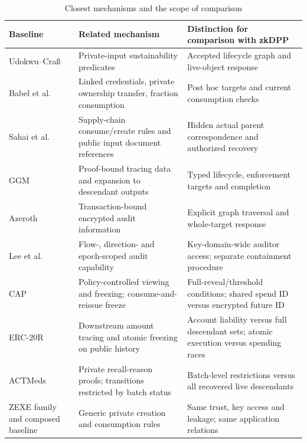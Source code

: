 \begin{table}[t]
\centering
\small
\caption{Closest mechanisms and the scope of comparison}
\label{tab:related}
\begin{tabularx}{\textwidth}{@{}p{30mm}YY@{}}
\toprule
Baseline & Related mechanism & Distinction for comparison with zkDPP \\
\midrule
Udokwu--Craß~\cite{udokwu-crass-2026}
& Private-input sustainability predicates
& Accepted lifecycle graph and live-object response \\
Babel et al.~\cite{babel-hicss-2025}
& Linked credentials, private ownership transfer, fraction consumption
& Post hoc targets and current consumption checks \\
Sahai et al.~\cite{sahai-supply-chain-2020}
& Supply-chain consume/create rules and public input document references
& Hidden actual parent correspondence and authorized recovery \\
GGM~\cite{garman-accountable-privacy-2017}
& Proof-bound tracing data and expansion to descendant outputs
& Typed lifecycle, enforcement targets and completion \\
Azeroth~\cite{jeong-azeroth-2023}
& Transaction-bound encrypted audit information
& Explicit graph traversal and whole-target response \\
Lee et al.~\cite{lee-token-guided-2026}
& Flow-, direction- and epoch-scoped audit capability
& Key-domain-wide auditor access; separate containment procedure \\
CAP~\cite{espresso-cap-spec-2022}
& Policy-controlled viewing and freezing; consume-and-reissue freeze
& Full-reveal/threshold conditions; shared spend ID versus encrypted future ID \\
ERC-20R~\cite{wang-erc20r-2022}
& Downstream amount tracing and atomic freezing on public history
& Account liability versus full descendant sets; atomic execution versus spending races \\
ACTMeds~\cite{sitaula-actmeds-2026}
& Private recall-reason proofs; transitions restricted by batch status
& Batch-level restrictions versus all recovered live descendants \\
ZEXE family and composed baseline~\cite{bowe-zexe-2020,xiong-verizexe-2023}
& Generic private creation and consumption rules
& Same trust, key access and leakage; same application relations \\
\bottomrule
\end{tabularx}
\end{table}

